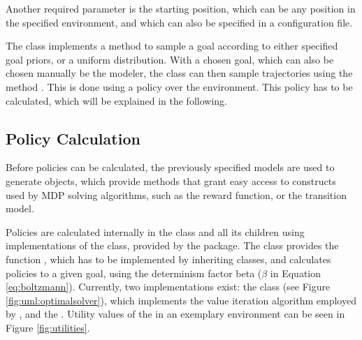 Another required parameter is the starting position, which can be any position in the specified environment, and which can also be specified in a configuration file.

The class implements a method to sample a goal according to either specified goal priors, or a uniform distribution.
With a chosen goal, which can also be chosen manually be the modeler, the class can then sample trajectories using the method .
This is done using a policy over the environment.
This policy has to be calculated, which will be explained in the following.

\subsection{Policy Calculation}
Before policies can be calculated, the previously specified models are used to generate  objects, which provide methods that grant easy access to constructs used by MDP solving algorithms, such as the reward function, or the transition model.

Policies are calculated internally in the  class and all its children using implementations of the  class, provided by the  package. 
The  class provides the function , which has to be implemented by inheriting classes, and calculates policies to a given goal, using the determinism factor beta ($\beta$ in Equation \ref{eq:boltzmann}).
Currently, two implementations exist: the  class (see Figure \ref{fig:uml:optimalsolver}), which implements the value iteration algorithm employed by , and the .
Utility values of the in an exemplary environment can be seen in Figure \ref{fig:utilities}. 

